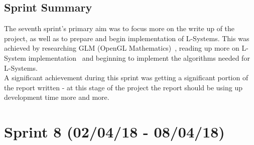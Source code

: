 \documentclass[a4paper,10pt]{report}
\begin{document}
\subsection{Sprint Summary}

The seventh sprint's primary aim was to focus more on the write up of the project, as well as to prepare and begin implementation of L-Systems. This was achieved by researching GLM (OpenGL Mathematics)~\cite{creation2016opengl}, reading up more on L-System implementation~\cite{prusinkiewicz2012algorithmic} and beginning to implement the algorithms needed for L-Systems.\\

A significant achievement during this sprint was getting a significant portion of the report written - at this stage of the project the report should be using up development time more and more.
\clearpage


\section{Sprint 8 (02/04/18 -  08/04/18)}
\end{document}

